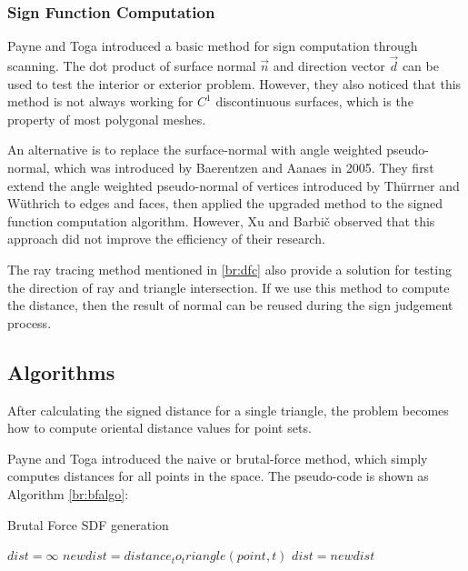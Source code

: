 \subsubsection{Sign Function Computation}

Payne and Toga \cite{payne1992sdf} introduced a basic method for sign computation through scanning. The dot product of surface normal $\vec{n} $ and direction vector $ \vec{d} $ can be used to test the interior or exterior problem. However, they also noticed that this method is not always working for $ C^{1} $ discontinuous surfaces, which is the property of most polygonal meshes.

\hspace*{\fill}

An alternative is to replace the surface-normal with angle weighted pseudo-normal, which was introduced by Baerentzen and Aanaes \cite{awpseuNormal} in 2005. They first extend the angle weighted pseudo-normal of vertices introduced by Thürrner and Wüthrich\cite{awpnfirst} to edges and faces, then applied the upgraded method to the signed function computation algorithm. However, Xu and Barbi\v{c} \cite{XuagpnSlow} observed that this approach did not improve the efficiency of their research.

\hspace*{\fill}

The ray tracing method \cite{AkenineMller2005FastMS} mentioned in \ref{br:dfc} also provide a solution for testing the direction of ray and triangle intersection. If we use this method to compute the distance, then the result of normal can be reused during the sign judgement process.

\subsection{Algorithms}
\label{br:algorithm2}

After calculating the signed distance for a single triangle, the problem becomes how to compute oriental distance values for point sets.

\hspace*{\fill}

Payne and Toga \cite{payne1992sdf} introduced the naive or brutal-force method, which simply computes distances for all points in the space. The pseudo-code is shown as Algorithm \ref{br:bfalgo}:

\begin{algorithm}[H]
    \caption{Brutal Force SDF generation}
    \label{br:bfalgo}
    \begin{algorithmic}

        \State $ dist=\infty $
        \State $ newdist = distance_to_triangle(point, t) $
            \State $ dist = newdist $
        \EndIf
        \EndFor
    \EndFor

    \end{algorithmic}
\end{algorithm}

